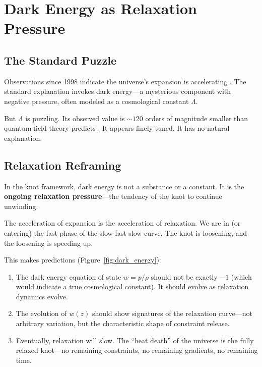 \documentclass[11pt,a4paper]{article}
\begin{document}
\section{Dark Energy as Relaxation Pressure}

\subsection{The Standard Puzzle}

Observations since 1998 indicate the universe's expansion is accelerating \cite{riess1998, perlmutter1999}. The standard explanation invokes dark energy---a mysterious component with negative pressure, often modeled as a cosmological constant $\Lambda$.

But $\Lambda$ is puzzling. Its observed value is $\sim 120$ orders of magnitude smaller than quantum field theory predicts \cite{weinberg1989}. It appears finely tuned. It has no natural explanation.

\subsection{Relaxation Reframing}

In the knot framework, dark energy is not a substance or a constant. It is the \textbf{ongoing relaxation pressure}---the tendency of the knot to continue unwinding.

The acceleration of expansion is the acceleration of relaxation. We are in (or entering) the fast phase of the slow-fast-slow curve. The knot is loosening, and the loosening is speeding up.

This makes predictions (Figure~\ref{fig:dark_energy}):
\begin{enumerate}
    \item The dark energy equation of state $w = p/\rho$ should not be exactly $-1$ (which would indicate a true cosmological constant). It should evolve as relaxation dynamics evolve.

    \item The evolution of $w(z)$ should show signatures of the relaxation curve---not arbitrary variation, but the characteristic shape of constraint release.

    \item Eventually, relaxation will slow. The ``heat death'' of the universe is the fully relaxed knot---no remaining constraints, no remaining gradients, no remaining time.
\end{enumerate}
\end{document}
